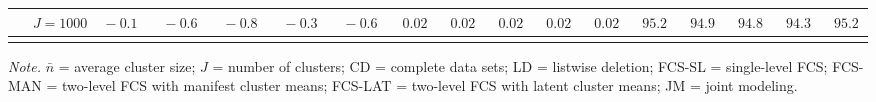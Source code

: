 \begin{sidewaystable}
\begin{threeparttable}
\begin{tabular}{llccccccccccccccc}
 & \nopagebreak $\;J=1000$  & $\phantom{0}{-}0.1\phantom{0}$ & $\phantom{0}{-}0.6\phantom{0}$ & $\phantom{0}{-}0.8\phantom{0}$ & $\phantom{0}{-}0.3\phantom{0}$ & $\phantom{0}{-}0.6\phantom{0}$ & $\phantom{0}0.02\phantom{0}$ & $\phantom{0}0.02\phantom{0}$ & $\phantom{0}0.02\phantom{0}$ & $\phantom{0}0.02\phantom{0}$ & $\phantom{0}0.02\phantom{0}$ & $\phantom{0}95.2\phantom{0}$ & $\phantom{0}94.9\phantom{0}$ & $\phantom{0}94.8\phantom{0}$ & $\phantom{0}94.3\phantom{0}$ & $\phantom{0}95.2\phantom{0}$ \\
[0.5ex]\hline\\[-1.6ex] 
\end{tabular}
\begin{tablenotes}{\footnotesize \textit{Note.} $\bar{n}$ = average cluster size; $J$ = number of clusters; CD = complete data sets; LD = listwise deletion; FCS-SL = single-level FCS; FCS-MAN = two-level FCS with manifest cluster means; FCS-LAT = two-level FCS with latent cluster means; JM = joint modeling.}\end{tablenotes}
\end{threeparttable}
\end{sidewaystable}
